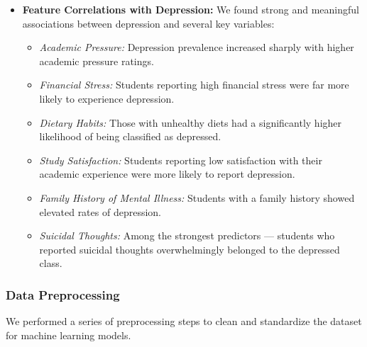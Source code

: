 \documentclass{article} %
\begin{document}
\begin{itemize}
    \item \textbf{Feature Correlations with Depression:} We found strong and meaningful associations between depression and several key variables:
    \begin{itemize}
        \item \textit{Academic Pressure:} Depression prevalence increased sharply with higher academic pressure ratings.
        \item \textit{Financial Stress:} Students reporting high financial stress were far more likely to experience depression.
        \item \textit{Dietary Habits:} Those with unhealthy diets had a significantly higher likelihood of being classified as depressed.
        \item \textit{Study Satisfaction:} Students reporting low satisfaction with their academic experience were more likely to report depression.
        \item \textit{Family History of Mental Illness:} Students with a family history showed elevated rates of depression.
        \item \textit{Suicidal Thoughts:} Among the strongest predictors — students who reported suicidal thoughts overwhelmingly belonged to the depressed class.
    \end{itemize}
\end{itemize}

\subsubsection*{Data Preprocessing}

We performed a series of preprocessing steps to clean and standardize the dataset for machine learning models.
\end{document}

